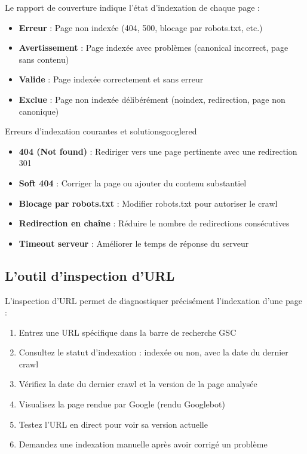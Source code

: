 \documentclass[12pt,a4paper,twoside]{report}
\begin{document}
Le rapport de couverture indique l'état d'indexation de chaque page :

\begin{itemize}
    \item \textbf{Erreur} : Page non indexée (404, 500, blocage par robots.txt, etc.)
    \item \textbf{Avertissement} : Page indexée avec problèmes (canonical incorrect, page sans contenu)
    \item \textbf{Valide} : Page indexée correctement et sans erreur
    \item \textbf{Exclue} : Page non indexée délibérément (noindex, redirection, page non canonique)
\end{itemize}

\begin{mybox}{Erreurs d'indexation courantes et solutions}{googlered}
\begin{itemize}
    \item \textbf{404 (Not found)} : Rediriger vers une page pertinente avec une redirection 301
    \item \textbf{Soft 404} : Corriger la page ou ajouter du contenu substantiel
    \item \textbf{Blocage par robots.txt} : Modifier robots.txt pour autoriser le crawl
    \item \textbf{Redirection en chaîne} : Réduire le nombre de redirections consécutives
    \item \textbf{Timeout serveur} : Améliorer le temps de réponse du serveur
\end{itemize}
\end{mybox}

\subsection{L'outil d'inspection d'URL}

L'inspection d'URL permet de diagnostiquer précisément l'indexation d'une page :

\begin{enumerate}
    \item Entrez une URL spécifique dans la barre de recherche GSC
    \item Consultez le statut d'indexation : indexée ou non, avec la date du dernier crawl
    \item Vérifiez la date du dernier crawl et la version de la page analysée
    \item Visualisez la page rendue par Google (rendu Googlebot)
    \item Testez l'URL en direct pour voir sa version actuelle
    \item Demandez une indexation manuelle après avoir corrigé un problème
\end{enumerate}
\end{document}
